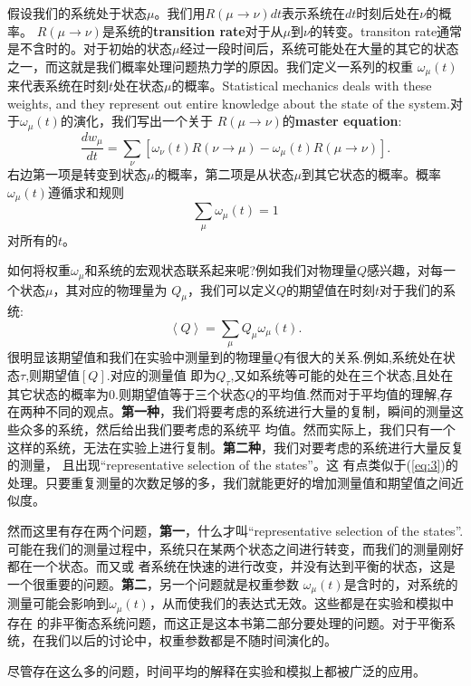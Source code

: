 假设我们的系统处于状态$\mu$。我们用$R(\mu\rightarrow{}\nu)dt$表示系统在$dt$时刻后处在$\nu$的概率。
$R(\mu\rightarrow{}\nu)$是系统的{\textbf{transition rate}}对于从$\mu$到$\nu$的转变。transiton rate通常是不含时的。对于初始的状态$\mu$经过一段时间后，系统可能处在大量的其它的状态之一，而这就是我们概率处理问题热力学的原因。我们定义一系列的权重
$\omega_{\mu}(t)$来代表系统在时刻$t$处在状态$\mu$的概率。Statistical mechanics deals with these weights, and they
represent out entire knowledge about the state of the system.对于$\omega_{\mu}(t)$的演化，我们写出一个关于
$R(\mu\rightarrow{}\nu)$的\textbf{master equation}:
\begin{equation}
  \label{eq:1}
  \frac{dw_{\mu}}{dt} = \sum_{\nu}\left[\omega_{\nu}(t)R(\nu\rightarrow{}\mu)-\omega_{\mu}(t)R(\mu\rightarrow{}\nu)\right].
\end{equation}
右边第一项是转变到状态$\mu$的概率，第二项是从状态$\mu$到其它状态的概率。概率$\omega_{\mu}(t)$遵循求和规则
\begin{equation}
  \label{eq:2}
  \sum_{\mu}\omega_{\mu}(t) = 1
\end{equation}
对所有的$t$。
\par
如何将权重$\omega_{\mu}$和系统的宏观状态联系起来呢?例如我们对物理量$Q$感兴趣，对每一个状态$\mu$，其对应的物理量为
$Q_{\mu}$，我们可以定义$Q$的期望值在时刻$t$对于我们的系统:
\begin{equation}
  \label{eq:3}
  \left<Q\right> = \sum_{\mu}Q_{\mu}\omega_{\mu}(t).
\end{equation}
很明显该期望值和我们在实验中测量到的物理量$Q$有很大的关系.例如,系统处在状态$\tau$,则期望值$\left[Q\right].$对应的测量值
即为$Q_{\tau}$,又如系统等可能的处在三个状态,且处在其它状态的概率为0.则期望值等于三个状态$Q$的平均值.然而对于平均值的理解,存
在两种不同的观点。\textbf{第一种}，我们将要考虑的系统进行大量的复制，瞬间的测量这些众多的系统，然后给出我们要考虑的系统平
均值。然而实际上，我们只有一个这样的系统，无法在实验上进行复制。\textbf{第二种}，我们对要考虑的系统进行大量反复的测量，
且出现\textquotedblleft{representative selection of the states}\textquotedblright{}。这
有点类似于(\ref{eq:3})的处理。只要重复测量的次数足够的多，我们就能更好的增加测量值和期望值之间近似度。
\par
然而这里有存在两个问题，\textbf{第一}，什么才叫\textquotedblleft{representative selection of the
  states}\textquotedblright.可能在我们的测量过程中，系统只在某两个状态之间进行转变，而我们的测量刚好都在一个状态。而又或
者系统在快速的进行改变，并没有达到平衡的状态，这是一个很重要的问题。\textbf{第二}，另一个问题就是权重参数
$\omega_{\mu}(t)$是含时的，对系统的测量可能会影响到$\omega_{\mu}(t)$，从而使我们的表达式无效。这些都是在实验和模拟中存在
的非平衡态系统问题，而这正是这本书第二部分要处理的问题。对于平衡系统，在我们以后的讨论中，权重参数都是不随时间演化的。
\par
尽管存在这么多的问题，时间平均的解释在实验和模拟上都被广泛的应用。








